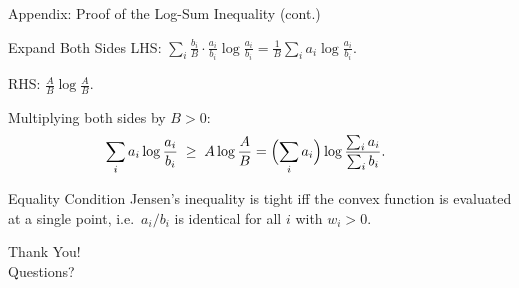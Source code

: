 \documentclass{beamer}
\begin{document}
\begin{frame}{Appendix: Proof of the Log-Sum Inequality (cont.)}
    \begin{block}{Expand Both Sides}
        LHS: $\displaystyle \sum_i \frac{b_i}{B} \cdot \frac{a_i}{b_i} \log \frac{a_i}{b_i} = \frac{1}{B} \sum_i a_i \log \frac{a_i}{b_i}$.

        \vspace{0.3em}
        RHS: $\displaystyle \frac{A}{B} \log \frac{A}{B}$.

        \vspace{0.3em}
        Multiplying both sides by $B > 0$:
        $$
            \sum_i a_i \log \frac{a_i}{b_i} \;\geq\; A \log \frac{A}{B} = \Bigl(\sum_i a_i\Bigr) \log \frac{\sum_i a_i}{\sum_i b_i}. \qquad 
        $$
    \end{block}

    \begin{exampleblock}{Equality Condition}
        Jensen's inequality is tight iff the convex function is evaluated at a single point, i.e.\ $a_i / b_i$ is identical for all $i$ with $w_i>0$.
    \end{exampleblock}
\end{frame}

\begin{frame}
    \centering
    \Huge Thank You!\\[1em]
    \large Questions?
\end{frame}
\end{document}
